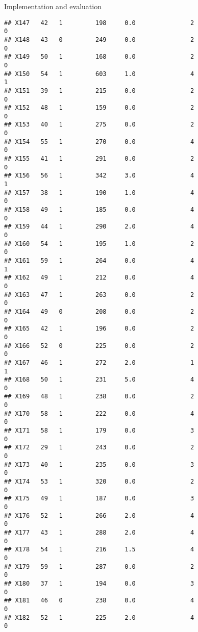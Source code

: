 \documentclass[
  ignorenonframetext,
]{beamer}
\begin{document}
\begin{frame}[fragile]{Implementation and evaluation}
\begin{verbatim}
## X147   42   1         198     0.0               2                   0
## X148   43   0         249     0.0               2                   0
## X149   50   1         168     0.0               2                   0
## X150   54   1         603     1.0               4                   1
## X151   39   1         215     0.0               2                   0
## X152   48   1         159     0.0               2                   0
## X153   40   1         275     0.0               2                   0
## X154   55   1         270     0.0               4                   0
## X155   41   1         291     0.0               2                   0
## X156   56   1         342     3.0               4                   1
## X157   38   1         190     1.0               4                   0
## X158   49   1         185     0.0               4                   0
## X159   44   1         290     2.0               4                   0
## X160   54   1         195     1.0               2                   0
## X161   59   1         264     0.0               4                   1
## X162   49   1         212     0.0               4                   0
## X163   47   1         263     0.0               2                   0
## X164   49   0         208     0.0               2                   0
## X165   42   1         196     0.0               2                   0
## X166   52   0         225     0.0               2                   0
## X167   46   1         272     2.0               1                   1
## X168   50   1         231     5.0               4                   0
## X169   48   1         238     0.0               2                   0
## X170   58   1         222     0.0               4                   0
## X171   58   1         179     0.0               3                   0
## X172   29   1         243     0.0               2                   0
## X173   40   1         235     0.0               3                   0
## X174   53   1         320     0.0               2                   0
## X175   49   1         187     0.0               3                   0
## X176   52   1         266     2.0               4                   0
## X177   43   1         288     2.0               4                   0
## X178   54   1         216     1.5               4                   0
## X179   59   1         287     0.0               2                   0
## X180   37   1         194     0.0               3                   0
## X181   46   0         238     0.0               4                   0
## X182   52   1         225     2.0               4                   0

\end{verbatim}
\end{frame}
\end{document}
